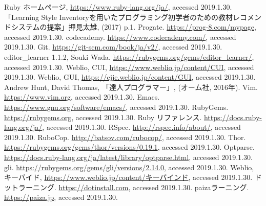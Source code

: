 \begin{thebibliography}{9}

 Ruby ホームページ, \url{https://www.ruby-lang.org/ja/}, accessed 2019.1.30.
 「Learning Style Inventoryを用いたプログラミング初学者のための教材レコメンドシステムの提案」押見太雄, (2017) p.1.
 Progate. \url{https://prog-8.com/mypage}, accessed 2019.1.30.
 codecademy. \url{https://www.codecademy.com/}, accessed 2019.1.30.
  Git. \url{https://git-scm.com/book/ja/v2/}, accessed 2019.1.30.
 editor\_learner 1.1.2, Souki Wada. \url{https://rubygems.org/gems/editor_learner/}, accessed 2019.1.30.
 Weblio, CUI, \url{https://www.weblio.jp/content/CUI}, accessed 2019.1.30.
 Weblio, GUI, \url{https://ejje.weblio.jp/content/GUI}, accessed 2019.1.30.
 Andrew Hunt, David Thomas, 「達人プログラマー」, (オーム社, 2016年).
 Vim. \url{https://www.vim.org}, accessed 2019.1.30.
 Emacs. \url{https://www.gnu.org/software/emacs/}, accessed 2019.1.30.
 RubyGems. \url{https://rubygems.org}, accessed 2019.1.30.
 Ruby リファレンス. \url{https://docs.ruby-lang.org/ja/}, accessed 2019.1.30.  
 RSpec. \url{http://rspec.info/about/}, accessed 2019.1.30.
 RuboCop. \url{http://batsov.com/rubocop/}, accessed 2019.1.30.
 Thor. \url{https://rubygems.org/gems/thor/versions/0.19.1}, accessed 2019.1.30.
 Optparse. \url{https://docs.ruby-lang.org/ja/latest/library/optparse.html}, accessed 2019.1.30.
 gli. \url{https://rubygems.org/gems/gli/versions/2.14.0}, accessed 2019.1.30.
 Weblio, キーバイド, \url{https://www.weblio.jp/content/キーバインド}, accessed 2019.1.30.
 ドットラーニング. \url{https://dotinstall.com}, accessed 2019.1.30.
 paizaラーニング. \url{https://paiza.jp}, accessed 2019.1.30.
\end{thebibliography} 
